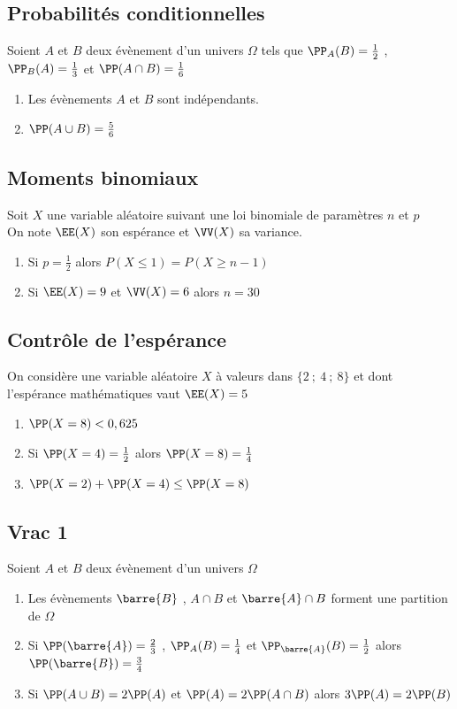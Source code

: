 \documentclass[oneside,12pt]{article}
\begin{document}
\subsection{Probabilités conditionnelles}
Soient $A$ et $B$ deux évènement d'un univers $\Omega$ tels que $\PP_A(B)=\frac{1}{2}$ , $\PP_B(A)=\frac{1}{3}$ et $\PP(A\cap B)=\frac{1}{6}$
\begin{enumerate}
	\item Les évènements $A$ et $B$ sont indépendants.
	\item $\PP(A\cup B)=\frac{5}{6}$
\end{enumerate}



\subsection{Moments binomiaux}
Soit $X$ une variable aléatoire suivant une loi binomiale de paramètres $n$ et $p$\\
On note $\EE(X)$ son espérance et $\VV(X)$ sa variance.
\begin{enumerate}
    \item Si $p=\frac{1}{2}$ alors $P(X\leq1)=P(X\geq n-1)$
    \item Si $\EE(X)=9$ et $\VV(X)=6$ alors $n=30$
\end{enumerate}



\subsection{Contrôle de l'espérance}
On considère une variable aléatoire $X$ à valeurs dans $\{2~;~4~;~8\}$ et dont l'espérance mathématiques vaut $\EE(X)=5$
\begin{enumerate}
	\item $\PP(X=8)<0,625$
	\item Si $\PP(X=4)=\frac{1}{2}$ alors $\PP(X=8)=\frac{1}{4}$
	\item $\PP(X=2)+\PP(X=4)\leq \PP(X=8)$
\end{enumerate}



\subsection{Vrac 1}
Soient $A$ et $B$ deux évènement d'un univers $\Omega$
\begin{enumerate}
	\item Les évènements $\barre{B}$ , $A \cap B$ et $\barre{A} \cap B$ forment une partition de $\Omega$
	\item Si $\PP(\barre{A})=\frac{2}{3}$ , $\PP_A(B)=\frac{1}{4}$ et $\PP_{\barre{A}}(B)=\frac{1}{2}$ alors $\PP(\barre{B})=\frac{3}{4}$
	\item Si $\PP(A \cup B)=2\PP(A)$ et $\PP(A)=2\PP(A \cap B)$ alors $3\PP(A)=2\PP(B)$
\end{enumerate}
\end{document}
